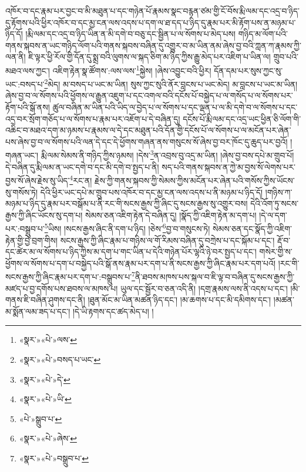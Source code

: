 འཁོར་བ་དང་རྣམ་པར་བྱང་བ་མི་མཐུན་པ་དང་གཉེན་པོ་རྣམས་སྣང་བརྙན་ཙམ་གྱི་ངོ་བོས་རྨི་ལམ་དང་འདྲ་བ་ཉིད་དུ་རྟོགས་པའི་ཕྱིར་འཁོར་བ་དང་མྱ་ངན་ལས་འདས་པ་དག་ལ་ཐ་དད་པ་ཉིད་དུ་རྣམ་པར་མི་རྟོག་པས་ན་མཉམ་པ་ཉིད་དོ། །རྨི་ལམ་དང་འདྲ་བ་ཉིད་ཡིན་ན་མི་དགེ་བ་བཅུ་དང་སྦྱིན་པ་ལ་སོགས་པ་མེད་པས། གཉིད་མ་ལོག་པའི་གནས་སྐབས་ན་ཡང་གཉིད་ལོག་པའི་གནས་སྐབས་བཞིན་དུ་འགྱུར་བ་མ་ཡིན་ནམ་ཞེས་བྱ་བའི་ཀླན་ཀ་རྣམས་ཀྱི་ལན་ནི། ཇི་ལྟར་ཕྱི་རོལ་གྱི་དོན་དུ་སྨྲ་བའི་ལུགས་ལ་སྐད་ཅིག་མ་ཉིད་ཀྱིས་རྒྱུ་མེད་པར་འཇིག་པ་ཡིན་ལ། གྲུབ་པའི་མཐའ་ལས་ཀྱང་། འཇིག་རྟེན་སྣ་ཚོགས་:ལས་ལས་\footnote{«སྣར་»«པེ་»ལས་}སྐྱེས། །ཞེས་འབྱུང་བའི་ཕྱིར། དོན་དམ་པར་སུས་ཀྱང་སུ་ཡང་:བསད་པ་\footnote{«སྣར་»«པེ་»བསད་པ་ཡང་}མེད། མ་བསད་པ་ཡང་མ་ཡིན། སུས་ཀྱང་སུའི་ནོར་བླངས་པ་ཡང་མེད། མ་བླངས་པ་ཡང་མ་ཡིན། ཞེས་བྱ་བ་ལ་སོགས་པའི་ཕྱོགས་ལ་རྒྱུན་འཇུག་པ་དང་འགལ་བའི་དངོས་པོ་བསྐྱེད་པ་ལ་གསོད་པ་ལ་སོགས་པར་རྟོག་པའི་སྒོ་ནས། ཚུལ་བཞིན་མ་ཡིན་པའི་ཡིད་ལ་བྱེད་པ་ལ་སོགས་པ་དང་ལྡན་པ་ལ་མི་དགེ་བ་ལ་སོགས་པ་དང་འདྲ་བར་སྲོག་གཅོད་པ་ལ་སོགས་པ་རྣམ་པར་འཇོག་པ་དེ་བཞིན་དུ། དངོས་པོ་རྨི་ལམ་དང་འདྲ་ཡང་ཕྱིན་ཅི་ལོག་གི་འཆིང་བ་མཐའ་དག་མ་ཉམས་པ་རྣམས་ལ་དེ་དང་མཐུན་པའི་དོན་གྱི་དངོས་པོ་ལ་སོགས་པ་ལ་མངོན་པར་ཞེན་པས་ཞེས་བྱ་བ་ལ་སོགས་པའི་ལན་དེ་དང་དེ་ཕྱོགས་གཞན་ནས་གསུངས་སོ་ཞེས་བྱ་བར་ཁོང་དུ་ཆུད་པར་བྱའོ། །གཞན་ཡང་། རྨི་ལམ་སེམས་ནི་གཉིད་ཀྱིས་ཉམས། །དེས་\footnote{«སྣར་»«པེ་»དེ་}ན་འབྲས་བུ་འདྲ་མ་ཡིན། །ཞེས་བྱ་བས་དཔེ་མ་གྲུབ་པོ། དེ་བཞིན་དུ་རྨི་ལམ་ན་ཡང་དགེ་བ་དང་མི་དགེ་བ་སྤྱད་པ་ནི། སད་པའི་གནས་སྐབས་ན་ཀྱེ་མ་བྱས་སོ་ལེགས་པར་བྱས་སོ་ཞེས་རྗེས་སུ་ཡིད་\footnote{«སྣར་»«པེ་»ཡི་}རང་ན། རྗེས་ཀྱི་གནས་སྐབས་ཀྱི་སེམས་ཀྱིས་མངོན་པར་ཞེན་པའི་གསོས་ཀྱིས་ཡོངས་སུ་གསོས་ཏེ། དེའི་ཕྱིར་ཡང་དཔེ་མ་གྲུབ་པས་འཁོར་བ་དང་མྱ་ངན་ལས་འདས་པ་ནི་མཉམ་པ་ཉིད་དོ། །གཉིས་ཀ་མཉམ་པ་ཉིད་དུ་རྣམ་པར་བསྒོམ་པ་ནི་རང་གི་སངས་རྒྱས་ཀྱི་ཞིང་དུ་སངས་རྒྱས་སུ་འགྱུར་བས། དེའི་འོག་ཏུ་སངས་རྒྱས་ཀྱི་ཞིང་ཡོངས་སུ་དག་པ། སེམས་ཅན་འཇིག་རྟེན་དེ་བཞིན་དུ། །སྣོད་ཀྱི་འཇིག་རྟེན་མ་དག་པ། །དེ་ལ་དག་པར་:བསྒྲུབ་པ་\footnote{«པེ་»སྒྲུབ་པ་}ཡིས། །སངས་རྒྱས་ཞིང་ནི་དག་པ་ཉིད། །ཅེས་\footnote{«སྣར་»«པེ་»ཞེས་}བྱ་བ་གསུངས་ཏེ། སེམས་ཅན་དང་སྣོད་ཀྱི་འཇིག་རྟེན་གྱི་བྱེ་བྲག་གིས། སངས་རྒྱས་ཀྱི་ཞིང་རྣམ་པ་གཉིས་ལ་གོ་རིམས་བཞིན་དུ་བཀྲེས་པ་དང་སྐོམ་པ་དང་། རྡོ་བ་དང་ཚེར་མ་ལ་སོགས་པ་ཉིད་ཀྱིས་མ་དག་པ་གང་ཡིན་པ་དེའི་གཉེན་པོར་ལྷའི་ཉེ་བར་སྤྱད་པ་དང་། གསེར་གྱི་ས་ཕྱོགས་ལ་སོགས་པ་དག་པ་བསྐྱེད་པའི་སྒོ་ནས་རྣམ་པར་དག་པ་ནི་སངས་རྒྱས་ཀྱི་ཞིང་རྣམ་པར་དག་པའོ། །རང་གི་སངས་རྒྱས་ཀྱི་ཞིང་རྣམ་པར་དག་པ་:བསྒྲུབས་པ་\footnote{«སྣར་»«པེ་»བསྒྲུབ་པ་}ནི་ཐབས་མཁས་པས་སྐལ་བ་ཇི་ལྟ་བ་བཞིན་དུ་སངས་རྒྱས་ཀྱི་མཛད་པ་བྱ་དགོས་པས་ཐབས་ལ་མཁས་པ། ཡུལ་དང་སྦྱོར་བ་ཅན་འདི་ནི། །དགྲ་རྣམས་ལས་ནི་འདས་པ་དང་། །མི་གནས་ཇི་བཞིན་ཤུགས་དང་ནི། །ཐུན་མོང་མ་ཡིན་མཚན་ཉིད་དང་། །མ་ཆགས་པ་དང་མི་དམིགས་དང་། །མཚན་མ་སྨོན་ལམ་ཟད་པ་དང་། །དེ་ཡི་རྟགས་དང་ཚད་མེད་པ། །
